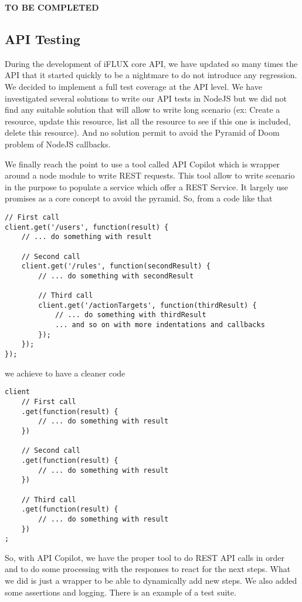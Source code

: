 \textbf{TO BE COMPLETED}

\subsection{API Testing}

During the development of iFLUX core API, we have updated so many times the API that it started quickly to be a nightmare to do not introduce any regression. We decided to implement a full test coverage at the API level. We have investigated several solutions to write our API tests in NodeJS but we did not find any suitable solution that will allow to write long scenario (ex: Create a resource, update this resource, list all the resource to see if this one is included, delete this resource). And no solution permit to avoid the Pyramid of Doom problem of NodeJS callbacks.

We finally reach the point to use a tool called API Copilot which is wrapper around a node module to write REST requests. This tool allow to write scenario in the purpose to populate a service which offer a REST Service. It largely use promises as a core concept to avoid the pyramid. So, from a code like that

\begin{lstlisting}
// First call
client.get('/users', function(result) {
	// ... do something with result

	// Second call
	client.get('/rules', function(secondResult) {
		// ... do something with secondResult

		// Third call
		client.get('/actionTargets', function(thirdResult) {
			// ... do something with thirdResult
			... and so on with more indentations and callbacks
		});
	});
});
\end{lstlisting}

we achieve to have a cleaner code

\begin{lstlisting}
client
	// First call
	.get(function(result) {
		// ... do something with result
	})
	
	// Second call
	.get(function(result) {
		// ... do something with result
	})
	
	// Third call
	.get(function(result) {
		// ... do something with result
	})
;	
\end{lstlisting}

So, with API Copilot, we have the proper tool to do REST API calls in order and to do some processing with the responses to react for the next steps. What we did is just a wrapper to be able to dynamically add new steps. We also added some assertions and logging. There is an example of a test suite.

